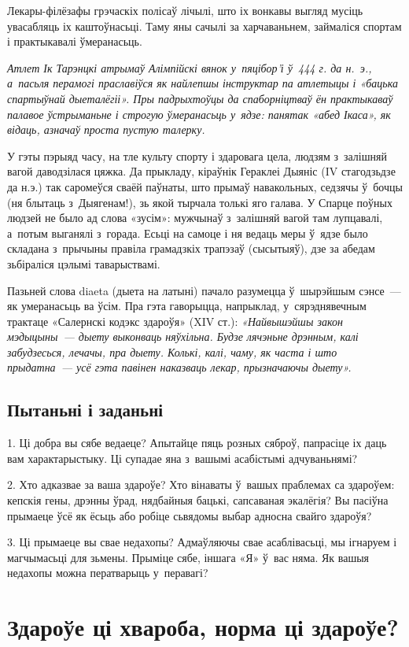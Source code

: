 Лекары-філёзафы грэчаскіх полісаў лічылі, што іх вонкавы выгляд мусіць увасабляць іх каштоўнасьці. Таму яны сачылі за харчаваньнем, займаліся спортам і практыкавалі ўмеранасьць. 

\emph{Атлет Ік Тарэнцкі атрымаў Алімпійскі вянок у~пяцібор'і ў~444 г. да н.~э., а~пасьля перамогі праславіўся як найлепшы інструктар па атлетыцы і «бацька спартыўнай дыеталёгіі». Пры падрыхтоўцы да спаборніцтваў ён практыкаваў палавое ўстрыманьне і строгую ўмеранасьць у~ядзе: панятак «абед Ікаса», як відаць, азначаў проста пустую талерку.}

У гэты пэрыяд часу, на тле культу спорту і здаровага цела, людзям з~залішняй вагой даводзілася цяжка. Да прыкладу, кіраўнік Гераклеі Дыяніс (IV стагодзьдзе да н.э.) так саромеўся сваёй паўнаты, што прымаў навакольных, седзячы ў~бочцы (ня блытаць з~Дыягенам!), зь якой тырчала толькі яго галава. У Спарце поўных людзей не было ад слова «зусім»: мужчынаў з~залішняй вагой там лупцавалі, а~потым выганялі з~горада. Есьці на самоце і ня ведаць меры ў~ядзе было складана з~прычыны правіла грамадзкіх трапэзаў (сысытыяў), дзе за абедам зьбіраліся цэлымі таварыствамі.

Пазьней слова diaeta (дыета на латыні) пачало разумецца ў~шырэйшым сэнсе~--- як умеранасьць ва ўсім. Пра гэта гаворыцца, напрыклад, у~сярэднявечным трактаце «Салернскі кодэкс здароўя» (XIV ст.): \emph{«Найвышэйшы закон мэдыцыны~--- дыету выконваць няўхільна. Будзе лячэньне дрэнным, калі забудзесься, лечачы, пра дыету. Колькі, калі, чаму, як часта і што прыдатна~--- усё гэта павінен наказваць лекар, прызначаючы дыету».}

\subsection*{Пытаньні і заданьні}

1. Ці добра вы сябе ведаеце? Апытайце пяць розных сяброў, папрасіце іх даць вам характарыстыку. Ці супадае яна з~вашымі асабістымі адчуваньнямі?

2. Хто адказвае за ваша здароўе? Хто вінаваты ў~вашых праблемах са здароўем: кепскія гены, дрэнны ўрад, нядбайныя бацькі, сапсаваная экалёгія? Вы пасіўна прымаеце ўсё як ёсьць або робіце сьвядомы выбар адносна свайго здароўя?

3. Ці прымаеце вы свае недахопы? Адмаўляючы свае асаблівасьці, мы ігнаруем і магчымасьці для зьмены. Прыміце сябе, іншага «Я» ў~вас няма. Як вашыя недахопы можна ператварыць у~перавагі?


\section{Здароўе ці хвароба, норма ці здароўе?}

